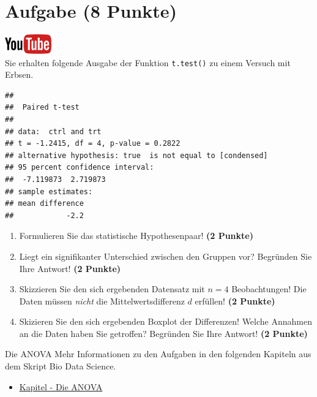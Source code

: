 \documentclass[a4paper, 9pt]{scrartcl}\usepackage[]{graphicx}\usepackage[]{xcolor}
\makeatletter
\newenvironment{kframe}{%
 \def\at@end@of@kframe{}%
 \ifinner\ifhmode%
  \def\at@end@of@kframe{\end{minipage}}%
  \begin{minipage}{\columnwidth}%
 \fi\fi%
 \def\FrameCommand##1{\hskip\@totalleftmargin \hskip-\fboxsep
 \colorbox{shadecolor}{##1}\hskip-\fboxsep
     \hskip-\linewidth \hskip-\@totalleftmargin \hskip\columnwidth}%
 \MakeFramed {\advance\hsize-\width
   \@totalleftmargin\z@ \linewidth\hsize
   \@setminipage}}%
 {\par\unskip\endMakeFramed%
 \at@end@of@kframe}
\newenvironment{knitrout}{}{} %
\makeatother
\begin{document}
\clearpage

\section{Aufgabe \hfill (8 Punkte)}

\hfill\href{https://youtu.be/kHmfEmU6lrk}{\includegraphics[width =
  2cm]{img/youtube}}\\[1Ex]



Sie erhalten folgende \Rlogo Ausgabe der Funktion \texttt{t.test()} zu einem Versuch mit Erbsen.

\begin{knitrout}
\color{fgcolor}\begin{kframe}
\begin{verbatim}
## 
## 	Paired t-test
## 
## data:  ctrl and trt
## t = -1.2415, df = 4, p-value = 0.2822
## alternative hypothesis: true  is not equal to [condensed]
## 95 percent confidence interval:
##  -7.119873  2.719873
## sample estimates:
## mean difference 
##            -2.2
\end{verbatim}
\end{kframe}
\end{knitrout}


\begin{enumerate}
  \item Formulieren Sie das statistische Hypothesenpaar! \textbf{(2
Punkte)}
\item Liegt ein signifikanter Unterschied zwischen den Gruppen vor?
  Begr{\"u}nden Sie Ihre Antwort! \textbf{(2 Punkte)}
\item Skizzieren Sie den sich ergebenden Datensatz mit $n = 4$
  Beobachtungen! Die Daten m{\"u}ssen \textit{nicht} die Mittelwertsdifferenz
  $d$ erf{\"u}llen! \textbf{(2 Punkte)} 
\item Skizieren Sie den sich ergebenden Boxplot der Differenzen! Welche Annahmen an die Daten haben Sie getroffen? Begr{\"u}nden Sie Ihre Antwort! \textbf{(2 Punkte)} 
\end{enumerate}
 
\clearpage
\begin{graybox}{Die ANOVA}
Mehr Informationen zu den Aufgaben in den folgenden Kapiteln aus dem Skript Bio Data Science.
  \begin{itemize}
  \item \href{https://jkruppa.github.io/stat-tests-anova.html}{Kapitel - Die ANOVA}
  \end{itemize}
\end{graybox}
\clearpage
\end{document}

